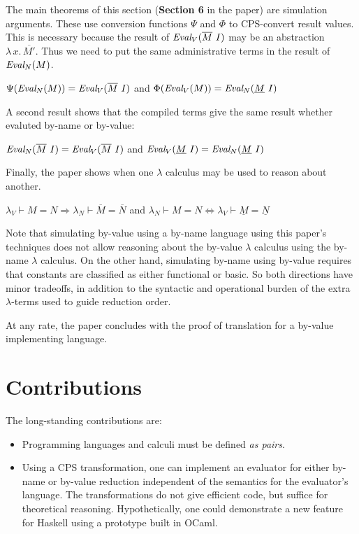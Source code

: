 \documentclass{article}
\begin{document}
The main theorems of this section ({\bf Section 6} in the paper) are simulation arguments.
These use conversion functions $\Psi$ and $\Phi$ to CPS-convert result values.
This is necessary because the result of $\emph{Eval}_V(\overline{M}~I)$ may be an abstraction $\lambda\,x.\,\overline{M'}$.
Thus we need to put the same administrative terms in the result of $\emph{Eval}_N(M)$.

\begin{theorem}
$\Psi(\emph{Eval}_N(M)) = \emph{Eval}_V(\overline{M}~I)$
and
$\Phi(\emph{Eval}_V(M)) = \emph{Eval}_N(\underline{M}~I)$
\end{theorem}

A second result shows that the compiled terms give the same result whether evaluted by-name or by-value:

\begin{theorem}
$\emph{Eval}_N(\overline{M}~I) = \emph{Eval}_V(\overline{M}~I)$
and
$\emph{Eval}_V(\underline{M}~I) = \emph{Eval}_N(\underline{M}~I)$
\end{theorem}

Finally, the paper shows when one $\lambda$ calculus may be used to reason about another.
\begin{theorem}
$\lambda_V \vdash M = N \Rightarrow \lambda_N \vdash \overline{M} = \overline{N}$
and
$\lambda_N \vdash M = N \iff \lambda_V \vdash \underline{M} = \underline{N}$
\end{theorem}

Note that simulating by-value using a by-name language using this paper's techniques does not allow reasoning about the by-value $\lambda$ calculus using the by-name $\lambda$ calculus.
On the other hand, simulating by-name using by-value requires that constants are classified as either functional or basic.
So both directions have minor tradeoffs, in addition to the syntactic and operational burden of the extra $\lambda$-terms used to guide reduction order.

At any rate, the paper concludes with the proof of translation for a by-value implementing language.


\section{Contributions}

The long-standing contributions are:
\begin{itemize}
\item
  Programming languages and calculi must be defined \emph{as pairs}.
\item
  Using a CPS transformation, one can implement an evaluator for either by-name or by-value reduction independent of the semantics for the evaluator's language.
  The transformations do not give efficient code, but suffice for theoretical reasoning.
  Hypothetically, one could demonstrate a new feature for Haskell using a prototype built in OCaml.
\end{itemize}


\footnotesize


\end{document}
